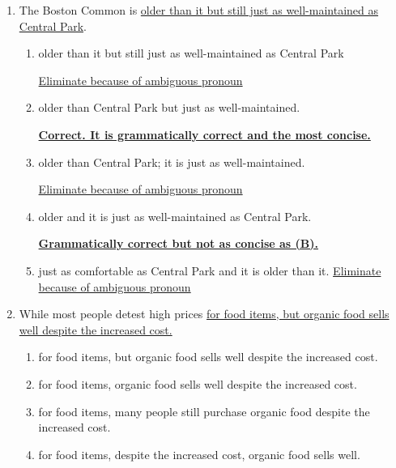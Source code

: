 \begin{enumerate}
\item The Boston Common is \ul{ older than it but still just as well-maintained as Central Park}.

\begin{enumerate}[label=(\Alph*)]

\item older than it but still just as well-maintained as Central Park 

  \ul{Eliminate because of ambiguous pronoun}
  
\item older than Central Park but just as well-maintained. 

\textbf{\ul{Correct. It is grammatically correct and the most concise. }}

\item  older than Central Park; it is just as well-maintained.   

  \ul{Eliminate because of ambiguous pronoun}
  
\item older and it is just as well-maintained as Central Park. 

\textbf{\ul{Grammatically correct but not as concise as (B).}}

\item just as comfortable as Central Park and it is older than it. \ul{Eliminate because of ambiguous pronoun}

\end{enumerate}

\bigskip


\bigskip
\item While most people detest high prices \ul{for food items, but organic food sells well despite the increased cost.}

\bigskip
\begin{enumerate}[label=(\Alph*)]
\item for food items, but organic food sells well despite the increased cost. \hrulefill
 
\item for food items, organic food sells well despite the increased cost. \hrulefill
 
\item for food items, many people still purchase organic food despite the increased cost. \hrulefill

\item for food items, despite the increased cost, organic food sells well. \hrulefill
 

\end{enumerate}
\end{enumerate}
